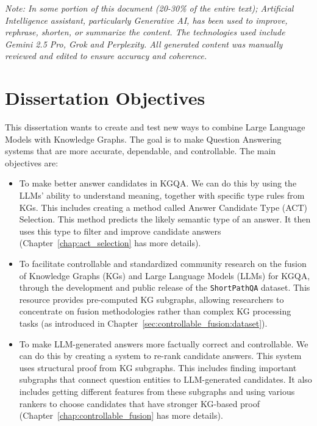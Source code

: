 \textit{Note: In some portion of this document (20-30\% of the entire text); Artificial Intelligence assistant, particularly Generative AI, has been used to improve, rephrase, shorten, or summarize the content. The technologies used include Gemini 2.5 Pro, Grok and Perplexity. All generated content was manually reviewed and edited to ensure accuracy and coherence.}

\section{Dissertation Objectives}
\label{sec:intro:objectives}
This dissertation wants to create and test new ways to combine Large Language Models with Knowledge Graphs. The goal is to make Question Answering systems that are more accurate, dependable, and controllable. The main objectives are:
\begin{itemize}
    \item To make better answer candidates in KGQA. We can do this by using the LLMs' ability to understand meaning, together with specific type rules from KGs. This includes creating a method called Answer Candidate Type (ACT) Selection. This method predicts the likely semantic type of an answer. It then uses this type to filter and improve candidate answers (Chapter~\ref{chap:act_selection} has more details).
    \item To facilitate controllable and standardized community research on the fusion of Knowledge Graphs (KGs) and Large Language Models (LLMs) for KGQA, through the development and public release of the \texttt{ShortPathQA} dataset. This resource provides pre-computed KG subgraphs, allowing researchers to concentrate on fusion methodologies rather than complex KG processing tasks (as introduced in Chapter~\ref{sec:controllable_fusion:dataset}).
    \item To make LLM-generated answers more factually correct and controllable. We can do this by creating a system to re-rank candidate answers. This system uses structural proof from KG subgraphs. This includes finding important subgraphs that connect question entities to LLM-generated candidates. It also includes getting different features from these subgraphs and using various rankers to choose candidates that have stronger KG-based proof (Chapter~\ref{chap:controllable_fusion} has more details).
\end{itemize}

